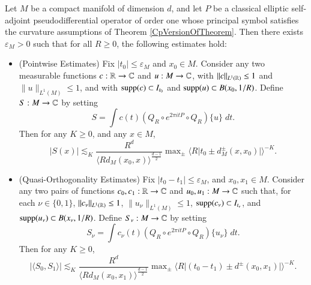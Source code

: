 \begin{prop} \label{theMainEstimatesForWave}
    Let $M$ be a compact manifold of dimension $d$, and let $P$ be a classical elliptic self-adjoint pseudodifferential operator of order one whose principal symbol satisfies the curvature assumptions of Theorem \ref{CpVersionOfTheorem}. Then there exists $\varepsilon_M > 0$ such that for all $R \geq 0$, the following estimates hold:
    \begin{itemize}%
        \item (Pointwise Estimates) Fix  $|t_0| \leq \varepsilon_M$ and $x_0 \in M$. Consider any two measurable functions $c: \operatorname{\mathbb{R}} \to \operatorname{\mathbb{C}}$ and $u: M \to \operatorname{\mathbb{C}}$, with $\| c \|_{L^1(\operatorname{\mathbb{R}})} \leq 1$ and $\| u \|_{L^1(M)} \leq 1$, and with $\operatorname{\text{supp}}(c) \subset I_{t_0}$ and $\operatorname{\text{supp}}(u) \subset B(x_0,1/R)$. Define $S: M \to \operatorname{\mathbb{C}}$ by setting
        \begin{equation}
            S = \int c(t) (Q_R \circ e^{2 \pi i t P} \circ Q_R) \{ u \}\; dt.
        \end{equation}
        Then for any $K \geq 0$, and any $x \in M$,
        \begin{equation}
            |S(x)| \lesssim_K \frac{R^d}{\langle R d_M(x_0,x) \rangle^{\frac{d-1}{2}}} \max\nolimits_{\pm} \Big\langle R \big| t_0 \pm d_M^\pm(x,x_0) \big| \Big\rangle^{-K}. 
        \end{equation}

        \item (Quasi-Orthogonality Estimates) Fix $|t_0 - t_1| \leq \varepsilon_M$, and $x_0, x_1 \in M$. Consider any two pairs of functions $c_0,c_1: \operatorname{\mathbb{R}} \to \operatorname{\mathbb{C}}$ and $u_0,u_1: M \to \operatorname{\mathbb{C}}$ such that, for each $\nu \in \{ 0, 1 \}$, $\| c_\nu \|_{L^1(\operatorname{\mathbb{R}})} \leq 1$, $\| u_\nu \|_{L^1(M)} \leq 1$, $\operatorname{\text{supp}}(c_\nu) \subset I_{t_\nu}$, and $\operatorname{\text{supp}}(u_\nu) \subset B(x_\nu,1/R)$. Define $S_\nu: M \to \operatorname{\mathbb{C}}$ by setting
        \begin{equation}
            S_\nu = \int c_\nu(t) (Q_R \circ e^{2 \pi i t P} \circ Q_R) \{ u_\nu \}\; dt.
        \end{equation}
        Then for any $K \geq 0$,
        \begin{equation} \label{AWOICJAWOIVJEAO120321903120938}
            \left| \langle S_0, S_1 \rangle \right| \lesssim_K \frac{R^d}{\langle R d_M(x_0,x_1) \rangle^{\frac{d-1}{2}}} \max\nolimits_{\pm} \Big\langle R \big| (t_0 - t_1) \pm d^\pm(x_0,x_1) \big| \Big\rangle^{-K}.
        \end{equation}
    \end{itemize}
\end{prop}

